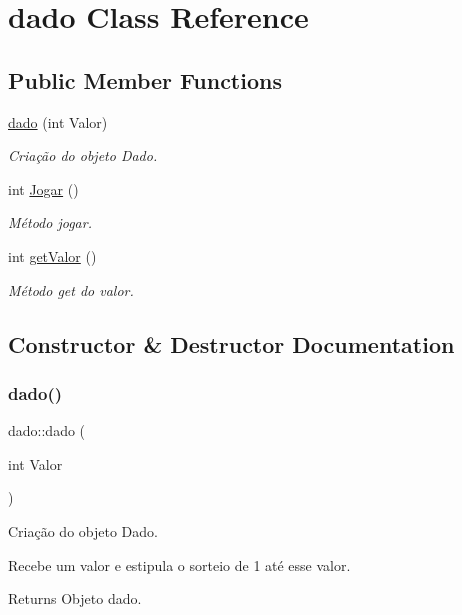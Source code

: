 \hypertarget{classdado}{}\section{dado Class Reference}
\label{classdado}
\subsection*{Public Member Functions}
\begin{DoxyCompactItemize}
\item 
\mbox{\hyperlink{classdado_a65c1404cb80eb753215830d2f176f334}{dado}} (int Valor)
\begin{DoxyCompactList}\small\item\em Criação do objeto Dado. \end{DoxyCompactList}\item 
int \mbox{\hyperlink{classdado_a768c4cc0bfb5f9d4b7dbdeb2fb11c5fa}{Jogar}} ()
\begin{DoxyCompactList}\small\item\em Método jogar. \end{DoxyCompactList}\item 
int \mbox{\hyperlink{classdado_a94a38beee28359ee6005889d5d32e754}{get\+Valor}} ()
\begin{DoxyCompactList}\small\item\em Método get do valor. \end{DoxyCompactList}\end{DoxyCompactItemize}


\subsection{Constructor \& Destructor Documentation}
\mbox{\label{classdado_a65c1404cb80eb753215830d2f176f334}} 
\subsubsection{\texorpdfstring{dado()}{dado()}}
{\footnotesize\ttfamily dado\+::dado (\begin{DoxyParamCaption}\item[{int}]{Valor }\end{DoxyParamCaption})}



Criação do objeto Dado. 

Recebe um valor e estipula o sorteio de 1 até esse valor. \begin{DoxyReturn}{Returns}
Objeto dado. 
\end{DoxyReturn}


